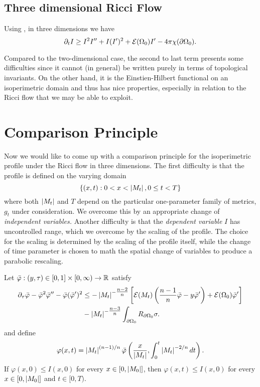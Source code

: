 \documentclass{amsart}
\begin{document}
\subsection*{Three dimensional Ricci Flow}

Using , in three dimensions we have
\begin{equation}
\label{eq:3d_viscosity_ricciflow}
\partial_t I \geq I^2I'' + I(I')^2 + \operatorname{\mathcal{E}}({\Omega_0})I' - 4\pi\chi(\partial {\Omega_0}).
\end{equation}


Compared to the two-dimensional case, the second to last term presents some difficulties since it cannot (in general) be written purely in terms of topological invariants. On the other hand, it is the Einstien-Hilbert functional on an isoperimetric domain and thus has nice properties, especially in relation to the Ricci flow that we may be able to exploit.


\section{Comparison Principle}
\label{sec:comparison}

Now we would like to come up with a comparison principle for the isoperimetric profile under the Ricci flow in three dimensions. The first difficulty is that the profile is defined on the varying domain
\[
\{(x, t) : 0 < x < \left|{M_t}\right|, 0 \leq t < T\}
\]
where both \(\left|{M_t}\right|\) and \(T\) depend on the particular one-parameter family of metrics, \(g_t\) under consideration. We overcome this by an appropriate change of \emph{independent variables.} Another difficulty is that the \emph{dependent variable} \(I\) has uncontrolled range, which we overcome by the scaling of the profile. The choice for the scaling is determined by the scaling of the profile itself, while the change of time parameter is chosen to math the spatial change of variables to produce a parabolic rescaling.

\begin{thm}
\label{thm:comparison}
Let \(\bar{\varphi} : (y, \tau) \in [0, 1] \times [0, \infty) \to \mathbb{R}\) satisfy
\[
\begin{split}
\partial_{\tau} \bar{\varphi} - \bar{\varphi}^2 \bar{\varphi}'' - \bar{\varphi}(\bar{\varphi}')^2 &\leq -\left|{M_t}\right|^{-\tfrac{n-2}{n}} \left[\operatorname{\mathcal{E}}(M_t)\left(\frac{n-1}{n} \bar{\varphi} - y \bar{\varphi}'\right) + \operatorname{\mathcal{E}}(\Omega_0)\bar{\varphi}'\right] \\
&- \left|{M_t}\right|^{-\tfrac{n-3}{n}}\int_{\partial {\Omega_0}} R_{\partial {\Omega_0}}\sigma.
\end{split}
\]
and define
\[
\varphi(x, t) = \left|{M_t}\right|^{(n-1)/n} \bar{\varphi} \left(\frac{x}{\left|{M_t}\right|}, \int_0^t \left|{M_t}\right|^{-2/n} dt\right).
\]
If \(\varphi(x, 0) \leq I(x, 0)\) for every \(x \in [0, \left|{M_0}\right|]\), then \(\varphi(x, t) \leq I(x, 0)\) for every \(x \in [0, \left|{M_0}\right|]\) and \(t \in [0, T)\).
\end{thm}
\end{document}
